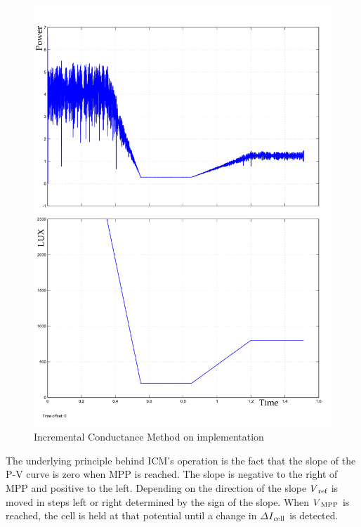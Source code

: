   \begin{figure}[H]
	   \begin{center}
		   \includegraphics[width=\textwidth]{images/inC_stateflow_changing_lux-1}
		   \caption{Incremental Conductance Method on implementation  }
		   \label{fig:Inc_result}
	   \end{center}
  \end{figure}
 The underlying principle behind \ac{ICM}'s operation is the fact that the slope of the P-V curve is zero when \ac{MPP} is reached. The slope is negative to the right of \ac{MPP} and positive to the left.
 Depending on the direction of the slope $V\textsubscript{ref}$ is moved in steps left or right determined by the sign of the slope. When $V\textsubscript{MPP}$ is reached, the cell is held at that potential until a change in $\varDelta$$I\textsubscript{cell}$ is detected.\\
 
